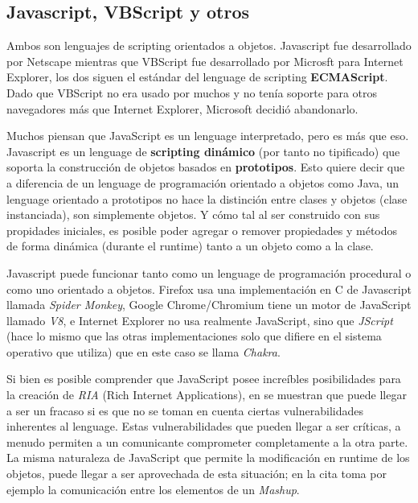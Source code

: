     \subsection{Javascript, VBScript y otros}
    \label{chap2:JS}
    Ambos son lenguajes de scripting orientados a objetos. Javascript fue desarrollado por Netscape mientras que VBScript fue desarrollado por Microsft para Internet Explorer, los dos siguen el estándar del lenguage de scripting \textbf{ECMAScript}. Dado que VBScript no era usado por muchos y no tenía soporte para otros navegadores más que Internet Explorer, Microsoft decidió abandonarlo.

    Muchos piensan que JavaScript es un lenguage interpretado, pero es más que eso. Javascript es un lenguage de \textbf{scripting dinámico} (por tanto no tipificado) que soporta la construcción de objetos basados en \textbf{prototipos}. Esto quiere decir que a diferencia de un lenguage de programación orientado a objetos como Java, un lenguage orientado a prototipos no hace la distinción entre clases y objetos (clase instanciada), son simplemente objetos. Y cómo tal al ser construido con sus propidades iniciales, es posible poder agregar o remover propiedades y métodos de forma dinámica (durante el runtime) tanto a un objeto como a la clase.
            
    Javascript puede funcionar tanto como un lenguage de programación procedural o como uno orientado a objetos. Firefox usa una implementación en C de Javascript llamada \textit{Spider Monkey}, Google Chrome/Chromium tiene un motor de JavaScript llamado \textit{V8}, e Internet Explorer no usa realmente JavaScript, sino que \textit{JScript} (hace lo mismo que las otras implementaciones solo que difiere en el sistema operativo que utiliza) que en este caso se llama \textit{Chakra}.
            
    Si bien es posible comprender que JavaScript posee increíbles posibilidades para la creación de \textit{RIA} (Rich Internet Applications), en \cite{barth2009attacks, Barth2009, Barth2010, Liu2012, Singh2014} se muestran que puede llegar a ser un fracaso si es que no se toman en cuenta ciertas vulnerabilidades inherentes al lenguage. Estas vulnerabilidades que pueden llegar a ser críticas, a menudo permiten a un comunicante comprometer completamente a la otra parte. La misma naturaleza de JavaScript que permite la modificación en runtime de los objetos, puede llegar a ser aprovechada de esta situación; en la cita toma por ejemplo la comunicación entre los elementos de un \textit{Mashup}.


